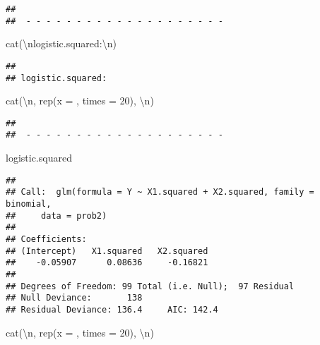\documentclass[
]{article}
\newenvironment{Shaded}{\begin{snugshade}}{\end{snugshade}}
\newcommand{\AttributeTok}[1]{\textcolor[rgb]{0.77,0.63,0.00}{#1}}
\newcommand{\DecValTok}[1]{\textcolor[rgb]{0.00,0.00,0.81}{#1}}
\newcommand{\FunctionTok}[1]{\textcolor[rgb]{0.00,0.00,0.00}{#1}}
\newcommand{\NormalTok}[1]{#1}
\newcommand{\SpecialCharTok}[1]{\textcolor[rgb]{0.00,0.00,0.00}{#1}}
\newcommand{\StringTok}[1]{\textcolor[rgb]{0.31,0.60,0.02}{#1}}
\begin{document}
\begin{verbatim}
## 
##  - - - - - - - - - - - - - - - - - - - -
\end{verbatim}

\begin{Shaded}
\begin{Highlighting}[]
\FunctionTok{cat}\NormalTok{(}\StringTok{\textquotesingle{}}\SpecialCharTok{\textbackslash{}n}\StringTok{logistic.squared:}\SpecialCharTok{\textbackslash{}n}\StringTok{\textquotesingle{}}\NormalTok{)}
\end{Highlighting}
\end{Shaded}

\begin{verbatim}
## 
## logistic.squared:
\end{verbatim}

\begin{Shaded}
\begin{Highlighting}[]
\FunctionTok{cat}\NormalTok{(}\StringTok{\textquotesingle{}}\SpecialCharTok{\textbackslash{}n}\StringTok{\textquotesingle{}}\NormalTok{, }\FunctionTok{rep}\NormalTok{(}\AttributeTok{x =} \StringTok{\textquotesingle{}{-}\textquotesingle{}}\NormalTok{, }\AttributeTok{times =} \DecValTok{20}\NormalTok{), }\StringTok{\textquotesingle{}}\SpecialCharTok{\textbackslash{}n}\StringTok{\textquotesingle{}}\NormalTok{)}
\end{Highlighting}
\end{Shaded}

\begin{verbatim}
## 
##  - - - - - - - - - - - - - - - - - - - -
\end{verbatim}

\begin{Shaded}
\begin{Highlighting}[]
\NormalTok{logistic.squared}
\end{Highlighting}
\end{Shaded}

\begin{verbatim}
## 
## Call:  glm(formula = Y ~ X1.squared + X2.squared, family = binomial, 
##     data = prob2)
## 
## Coefficients:
## (Intercept)   X1.squared   X2.squared  
##    -0.05907      0.08636     -0.16821  
## 
## Degrees of Freedom: 99 Total (i.e. Null);  97 Residual
## Null Deviance:       138 
## Residual Deviance: 136.4     AIC: 142.4
\end{verbatim}

\begin{Shaded}
\begin{Highlighting}[]
\FunctionTok{cat}\NormalTok{(}\StringTok{\textquotesingle{}}\SpecialCharTok{\textbackslash{}n}\StringTok{\textquotesingle{}}\NormalTok{, }\FunctionTok{rep}\NormalTok{(}\AttributeTok{x =} \StringTok{\textquotesingle{}{-}\textquotesingle{}}\NormalTok{, }\AttributeTok{times =} \DecValTok{20}\NormalTok{), }\StringTok{\textquotesingle{}}\SpecialCharTok{\textbackslash{}n}\StringTok{\textquotesingle{}}\NormalTok{)}
\end{Highlighting}
\end{Shaded}
\end{document}

